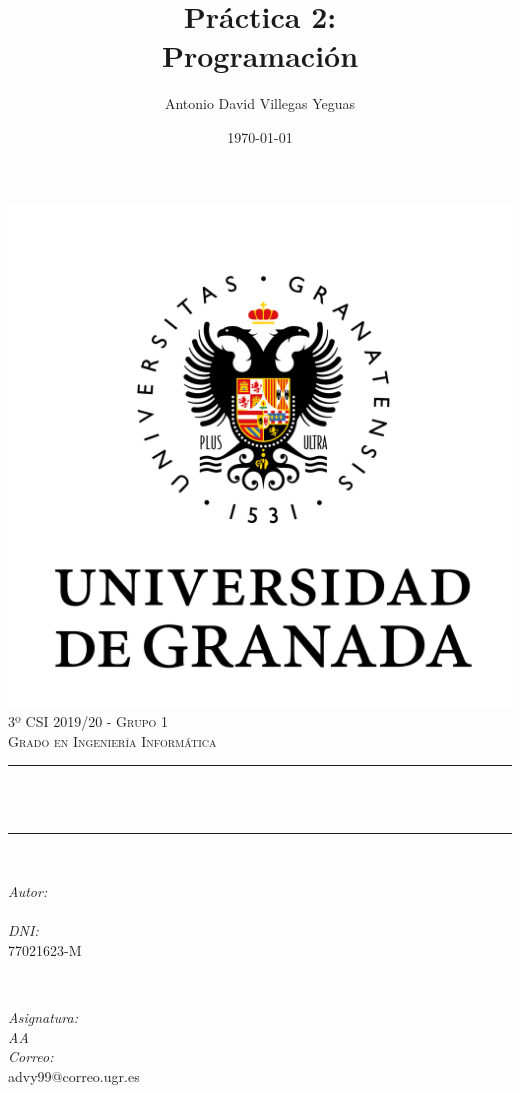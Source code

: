 \documentclass[12pt, spanish]{article}
\title{Práctica 2:\\
Programación  \hspace{0.05cm} }
\author{Antonio David Villegas Yeguas}
\date{\today}
\makeatletter
\let\thetitle\@title
\let\theauthor\@author
\makeatother
\begin{document}

\begin{titlepage}
    \centering
    \vspace*{0.3 cm}
    \includegraphics[scale = 0.50]{ugr.png}\\[0.7 cm]
    \textsc{\large 3º CSI 2019/20 - Grupo 1}\\[0.5 cm]            
    \textsc{\large Grado en Ingeniería Informática}\\[0.5 cm]              
    \rule{\linewidth}{0.2 mm} \\[0.2 cm]
    { \huge \bfseries \thetitle}\\
    \rule{\linewidth}{0.2 mm} \\[1 cm]
    
    \begin{minipage}{0.4\textwidth}
        \begin{flushleft} \large
            \emph{Autor:}\\
            \theauthor\\ 
			 \emph{DNI:}\\
            77021623-M
            \end{flushleft}
            \end{minipage}~
            \begin{minipage}{0.4\textwidth}
            \begin{flushright} \large
            \emph{Asignatura: \\
            AA}   \\     
            \emph{Correo:}\\
            advy99@correo.ugr.es           
        \end{flushright}
    \end{minipage}\\[0.5cm]
  

\end{titlepage}
\end{document}
